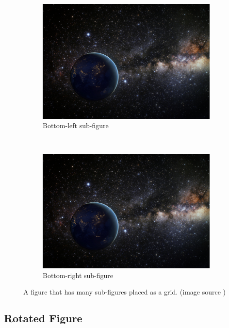\begin{figure}[H]
\begin{subfigure}{.45\textwidth}
        \includegraphics[width=\linewidth]{figures/samples/earth-in-space.jpg}
        \caption{Bottom-left sub-figure}
        \label{fig:sub-bottom-left}
    \end{subfigure}
    ~
    \begin{subfigure}{.45\textwidth}
        \centering
        \includegraphics[width=\linewidth]{figures/samples/earth-in-space.jpg}
        \caption{Bottom-right sub-figure}
        \label{fig:sub-bottom-right}
    \end{subfigure}
    \caption{A figure that has many sub-figures placed as a grid. (image source \cite{pdp:23})}
    \label{fig:main-label-for-subfigures}
\end{figure}


\subsection{Rotated Figure}

